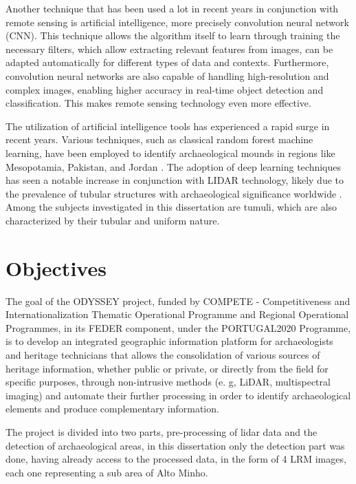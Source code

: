 Another technique that has been used a lot in recent years in conjunction with remote sensing is artificial intelligence, more precisely convolution neural network (CNN). This technique allows the algorithm itself to learn through training the necessary filters, which allow extracting relevant features from images, can be adapted automatically for different types of data and contexts. Furthermore, convolution neural networks are also capable of handling high-resolution and complex images, enabling higher accuracy in real-time object detection and classification. This makes remote sensing technology even more effective.




The utilization of artificial intelligence tools has experienced a rapid surge in recent years\cite{aumentoexpDL}. Various techniques, such as classical random forest machine learning, have been employed to identify archaeological mounds in regions like Mesopotamia, Pakistan, and Jordan \cite{LIDARCOMDL}. The adoption of deep learning techniques has seen a notable increase in conjunction with LIDAR technology, likely due to the prevalence of tubular structures with archaeological significance worldwide \cite{LIDARCOMDL}. Among the subjects investigated in this dissertation are tumuli, which are also characterized by their tubular and uniform nature.


\section{Objectives}
The goal of the ODYSSEY project, funded by COMPETE - Competitiveness and Internationalization Thematic Operational Programme and Regional Operational Programmes, in its FEDER component, under the PORTUGAL2020 Programme, is to develop an integrated geographic information platform for archaeologists and heritage technicians that allows the consolidation of various sources of heritage information, whether public or private, or directly from the field for specific purposes, through non-intrusive methods (e. g, LiDAR, multispectral imaging) and automate their further processing in order to identify archaeological elements and produce complementary information.

The project is divided into two parts, pre-processing of lidar data and the detection of archaeological areas, in this dissertation only the detection part was done, having already access to the processed data, in the form of 4 LRM images, each one representing a sub area of Alto Minho.

